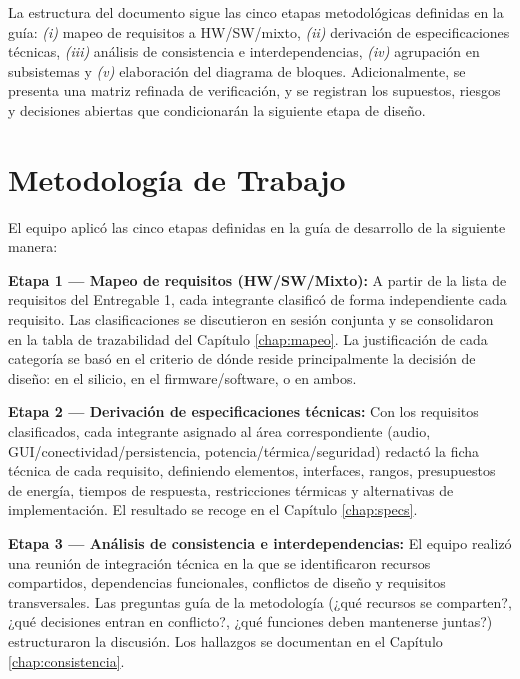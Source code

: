 \documentclass[%
	paper=a4,
	twoside=false,
	parskip=half,
	chapterprefix=false,
	10pt,
	headings=normal,
	bibliography=totoc,
	listof=totoc,
	titlepage=on,
	captions=tableabove,
	draft=false,
]{scrbook}%
\begin{document}
La estructura del documento sigue las cinco etapas metodológicas definidas en la guía: \textit{(i)} mapeo de requisitos a HW/SW/mixto, \textit{(ii)} derivación de especificaciones técnicas, \textit{(iii)} análisis de consistencia e interdependencias, \textit{(iv)} agrupación en subsistemas y \textit{(v)} elaboración del diagrama de bloques. Adicionalmente, se presenta una matriz refinada de verificación, y se registran los supuestos, riesgos y decisiones abiertas que condicionarán la siguiente etapa de diseño.

\chapter{Metodología de Trabajo}

El equipo aplicó las cinco etapas definidas en la guía de desarrollo de la siguiente manera:

\textbf{Etapa 1 — Mapeo de requisitos (HW/SW/Mixto):} A partir de la lista de requisitos del Entregable 1, cada integrante clasificó de forma independiente cada requisito. Las clasificaciones se discutieron en sesión conjunta y se consolidaron en la tabla de trazabilidad del Capítulo \ref{chap:mapeo}. La justificación de cada categoría se basó en el criterio de dónde reside principalmente la decisión de diseño: en el silicio, en el firmware/software, o en ambos.

\textbf{Etapa 2 — Derivación de especificaciones técnicas:} Con los requisitos clasificados, cada integrante asignado al área correspondiente (audio, GUI/conectividad/persistencia, potencia/térmica/seguridad) redactó la ficha técnica de cada requisito, definiendo elementos, interfaces, rangos, presupuestos de energía, tiempos de respuesta, restricciones térmicas y alternativas de implementación. El resultado se recoge en el Capítulo \ref{chap:specs}.

\textbf{Etapa 3 — Análisis de consistencia e interdependencias:} El equipo realizó una reunión de integración técnica en la que se identificaron recursos compartidos, dependencias funcionales, conflictos de diseño y requisitos transversales. Las preguntas guía de la metodología (¿qué recursos se comparten?, ¿qué decisiones entran en conflicto?, ¿qué funciones deben mantenerse juntas?) estructuraron la discusión. Los hallazgos se documentan en el Capítulo \ref{chap:consistencia}.
\end{document}
